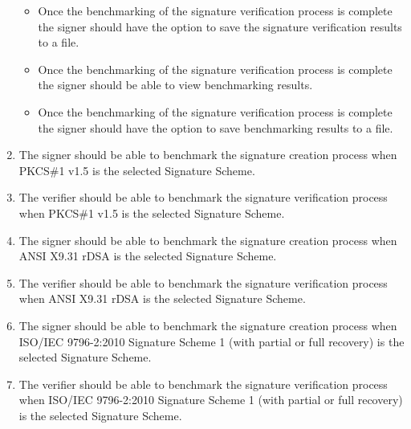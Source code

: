 \documentclass[]{final_report}
\theoremstyle{definition}
\begin{document}
\begin{enumerate}
\begin{itemize}
\item Once the benchmarking of the signature verification process is complete the signer should have the option to save the signature verification results to a file.
\item Once the benchmarking of the signature verification process is complete the signer should be able to view benchmarking results.
\item Once the benchmarking of the signature verification process is complete the signer should have the option to save benchmarking results to a file.
\end{itemize}
\item The signer should be able to benchmark the signature creation process when PKCS\#1 v1.5 is the selected Signature Scheme.
\item The verifier should be able to benchmark the signature verification process when PKCS\#1 v1.5 is the selected Signature Scheme.
\item The signer should be able to benchmark the signature creation process when ANSI X9.31 rDSA is the selected Signature Scheme.
\item The verifier should be able to benchmark the signature verification process when ANSI X9.31 rDSA is the selected Signature Scheme.
\item The signer should be able to benchmark the signature creation process when ISO/IEC 9796-2:2010 Signature Scheme 1 (with partial or full recovery) is the selected Signature Scheme.
\item The verifier should be able to benchmark the signature verification process when ISO/IEC 9796-2:2010 Signature Scheme 1 (with partial or full recovery) is the selected Signature Scheme.
\end{enumerate}
\end{document}
